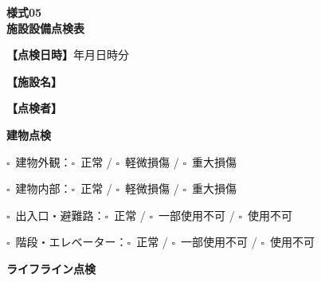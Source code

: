 \documentclass[a4paper,12pt]{jarticle}
\newcommand{\checkbox}{$\square$\ }
\newcommand{\underlinespace}[1]{\underline{\hspace{#1}}}
\begin{document}
\begin{center}
{\Large\textbf{様式05}}\\
\vspace{3mm}
{\Large\textbf{施設設備点検表}}
\end{center}
\vspace{5mm}

\noindent
\textbf{【点検日時】}\underlinespace{2cm}年\underlinespace{1cm}月\underlinespace{1cm}日\underlinespace{1cm}時\underlinespace{1cm}分

\vspace{3mm}

\noindent
\textbf{【施設名】} \underlinespace{10cm}

\vspace{3mm}

\noindent
\textbf{【点検者】} \underlinespace{10cm}

\vspace{8mm}

\begin{center}
\textbf{\large 建物点検}
\end{center}

\vspace{3mm}

\noindent
\checkbox 建物外観：\quad \checkbox 正常 \quad / \quad \checkbox 軽微損傷 \quad / \quad \checkbox 重大損傷

\vspace{2mm}

\noindent
\checkbox 建物内部：\quad \checkbox 正常 \quad / \quad \checkbox 軽微損傷 \quad / \quad \checkbox 重大損傷

\vspace{2mm}

\noindent
\checkbox 出入口・避難路：\quad \checkbox 正常 \quad / \quad \checkbox 一部使用不可 \quad / \quad \checkbox 使用不可

\vspace{2mm}

\noindent
\checkbox 階段・エレベーター：\quad \checkbox 正常 \quad / \quad \checkbox 一部使用不可 \quad / \quad \checkbox 使用不可

\vspace{8mm}

\begin{center}
\textbf{\large ライフライン点検}
\end{center}

\vspace{3mm}
\end{document}
